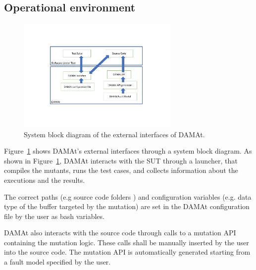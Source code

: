 \subsection{Operational environment}


\begin{figure}[t]
  \centering
  \includegraphics[width=0.7\textwidth]{images/damat-external.pdf}
      \caption{System block diagram of the external interfaces of DAMAt.}
      \label{fig:damat:external}
\end{figure}

Figure~\ref{fig:damat:external} shows DAMAt's external interfaces through a system block diagram.
As shown in Figure~\ref{fig:damat:external}, DAMAt interacts with the SUT through a launcher, that compiles the mutants, runs the test cases, and collects information about the executions and the results.

The correct paths (e.g source code folders ) and configuration variables (e.g. data type of the buffer targeted by the mutation) are set in the DAMAt configuration file by the user as bash variables.

DAMAt also interacts with the source code through calls to a mutation API containing the mutation logic. These calls shall be manually inserted by the user into the source code.
The mutation API is automatically generated starting from a fault model specified by the user.


